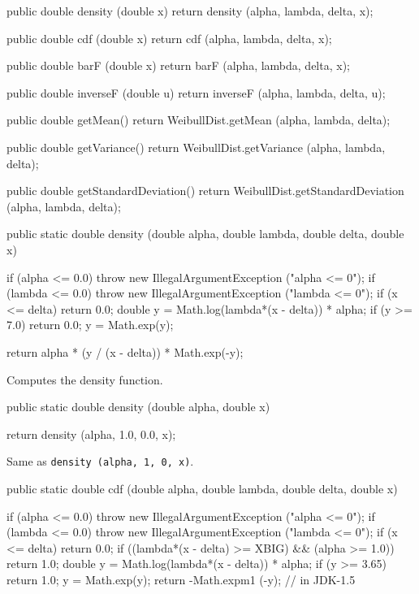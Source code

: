 \begin{code}\begin{hide}

   public double density (double x) {
      return density (alpha, lambda, delta, x);
   }

   public double cdf (double x) {
      return cdf (alpha, lambda, delta, x);
   }

   public double barF (double x) {
      return barF (alpha, lambda, delta, x);
   }

   public double inverseF (double u) {
      return inverseF (alpha, lambda, delta, u);
   }

   public double getMean() {
      return WeibullDist.getMean (alpha, lambda, delta);
   }

   public double getVariance() {
      return WeibullDist.getVariance (alpha, lambda, delta);
   }

   public double getStandardDeviation() {
      return WeibullDist.getStandardDeviation (alpha, lambda, delta);
   }\end{hide}

   public static double density (double alpha, double lambda,
                                 double delta, double x)\begin{hide} {
      if (alpha <= 0.0)
        throw new IllegalArgumentException ("alpha <= 0");
      if (lambda <= 0.0)
        throw new IllegalArgumentException ("lambda <= 0");
      if (x <= delta)
         return 0.0;
      double y = Math.log(lambda*(x - delta)) * alpha;
      if (y >= 7.0)
         return 0.0;
      y = Math.exp(y);

      return alpha * (y / (x - delta)) * Math.exp(-y);
   }\end{hide}
\end{code}
\begin{tabb} Computes the density function.
\end{tabb}
\begin{code}

   public static double density (double alpha, double x)\begin{hide} {
      return density (alpha, 1.0, 0.0, x);
   }\end{hide}
\end{code}
\begin{tabb} Same as \texttt{density (alpha, 1, 0, x)}.
\end{tabb}
\begin{code}

   public static double cdf (double alpha, double lambda,
                             double delta, double x)\begin{hide} {
      if (alpha <= 0.0)
        throw new IllegalArgumentException ("alpha <= 0");
      if (lambda <= 0.0)
        throw new IllegalArgumentException ("lambda <= 0");
      if (x <= delta)
         return 0.0;
      if ((lambda*(x - delta) >= XBIG) && (alpha >= 1.0))
         return 1.0;
      double y = Math.log(lambda*(x - delta)) * alpha;
      if (y >= 3.65)
         return 1.0;
      y = Math.exp(y);
      return -Math.expm1 (-y);   // in JDK-1.5
   }\end{hide}
\end{code}
